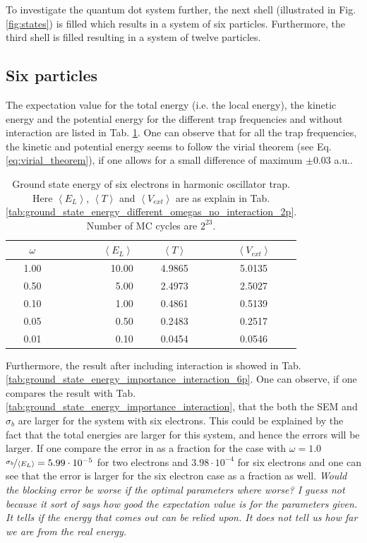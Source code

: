 To investigate the quantum dot system further, the next shell (illustrated in Fig. \ref{fig:states}) is filled which results in a system of six particles. Furthermore, the third shell is filled resulting in a system of twelve particles. 

\subsection{Six particles}

The expectation value for the total energy (i.e. the local energy), the kinetic energy and the potential energy for the different trap frequencies and without interaction are listed in Tab. \ref{tab:ground_state_energy_importance_6p}. One can observe that for all the trap frequencies, the kinetic and potential energy seems to follow the virial theorem (see Eq. \ref{eq:virial_theorem}), if one allows for a small difference of maximum $\pm 0.03$ a.u.. 

\begin{table}[H]\caption{Ground state energy of six electrons in harmonic oscillator trap. Here $\left< E_L \right>$, $\left< T \right>$ and $\left< V_{ext}\right>$  are as explain in Tab. \ref{tab:ground_state_energy_different_omegas_no_interaction_2p}. Number of MC cycles are $2^{23}$. }\label{tab:ground_state_energy_importance_6p}
\center
\begin{tabular}{c|rcc}
$\omega$ & $\left< E_L \right>$  & $\left< T \right>$  & $\left< V_{ext}\right>$ \\ \hline
1.00 & 10.00 & 4.9865 & 5.0135\\ 
0.50 & 5.00 & 2.4973 & 2.5027\\
0.10 & 1.00 & 0.4861 & 0.5139\\
0.05 & 0.50 & 0.2483 & 0.2517\\
0.01 & 0.10 & 0.0454 & 0.0546\\
\end{tabular}
\end{table}

Furthermore, the result after including interaction is showed in Tab. \ref{tab:ground_state_energy_importance_interaction_6p}. One can observe, if one compares the result with Tab. \ref{tab:ground_state_energy_importance_interaction}, that the both the SEM and $\sigma_b$ are larger for the system with six electrons. This could be explained by the fact that the total energies are larger for this system, and hence the errors will be larger. If one compare the error in as a fraction for the case with $\omega = 1.0$ $\nicefrac{\sigma_b}{\left< E_L \right>} = 5.99 \cdot 10^{-5}$ for two electrons and $3.98\cdot 10^{-4}$ for six electrons and one can see that the error is larger for the six electron case as a fraction as well. \textit{Would the blocking error be worse if the optimal parameters where worse? I guess not because it sort of says how good the expectation value is for the parameters given. It tells if the energy that comes out can be relied upon. It does not tell us how far we are from the real energy.}

